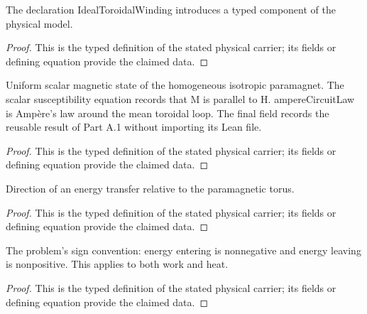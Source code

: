 \begin{definition}
  \label{def:physics:IPhO_2026_3_A_2:aux011}
  The declaration IdealToroidalWinding introduces a typed component of the physical model.
\end{definition}
\begin{proof}
  This is the typed definition of the stated physical carrier; its fields or defining equation provide the claimed data.
\end{proof}

\begin{definition}
  \label{def:physics:IPhO_2026_3_A_2:aux012}
  Uniform scalar magnetic state of the homogeneous isotropic paramagnet. The scalar susceptibility equation records that M is parallel to H. ampereCircuitLaw is Ampère's law around the mean toroidal loop. The final field records the reusable result of Part A.1 without importing its Lean file.
\end{definition}
\begin{proof}
  This is the typed definition of the stated physical carrier; its fields or defining equation provide the claimed data.
\end{proof}

\begin{definition}
  \label{def:physics:IPhO_2026_3_A_2:aux013}
  Direction of an energy transfer relative to the paramagnetic torus.
\end{definition}
\begin{proof}
  This is the typed definition of the stated physical carrier; its fields or defining equation provide the claimed data.
\end{proof}

\begin{definition}
  \label{def:physics:IPhO_2026_3_A_2:aux014}
  The problem's sign convention: energy entering is nonnegative and energy leaving is nonpositive. This applies to both work and heat.
\end{definition}
\begin{proof}
  This is the typed definition of the stated physical carrier; its fields or defining equation provide the claimed data.
\end{proof}

